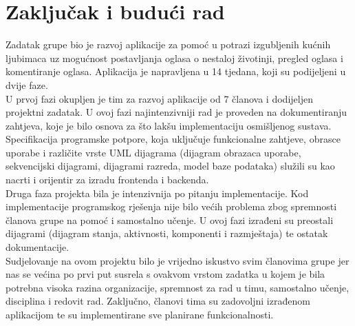 \chapter{Zaključak i budući rad}
		
		
		
		
		Zadatak grupe bio je razvoj aplikacije za pomoć u potrazi izgubljenih kućnih ljubimaca uz mogućnost postavljanja oglasa o nestaloj životinji, pregled oglasa i komentiranje oglasa. Aplikacija je napravljena  u 14 tjedana, koji su podijeljeni u dvije faze.\\
		\indent U prvoj fazi okupljen je tim za razvoj aplikacije od 7 članova i dodijeljen projektni zadatak. U ovoj fazi najintenzivniji rad je proveden na dokumentiranju zahtjeva, koje je bilo osnova za što lakšu implementaciju osmišljenog sustava. Specifikacija programske potpore, koja uključuje funkcionalne zahtjeve, obrasce uporabe i različite vrste UML dijagrama (dijagram obrazaca uporabe, sekvencijski dijagrami, dijagrami razreda, model baze podataka) služili su kao nacrti i orijentir za izradu frontenda i backenda.\\
		\indent Druga faza projekta bila je intenzivnija po pitanju implementacije. Kod implementacije programskog rješenja nije bilo većih problema zbog spremnosti članova grupe na pomoć i samostalno učenje. U ovoj fazi izrađeni su preostali dijagrami (dijagram stanja, aktivnosti, komponenti i razmještaja) te ostatak dokumentacije.\\
		\indent Sudjelovanje na ovom projektu bilo je vrijedno iskustvo svim članovima grupe jer nas se većina po prvi put susrela s ovakvom vrstom zadatka u kojem je bila potrebna visoka razina organizacije, spremnost za rad u timu, samostalno učenje, disciplina i redovit rad. Zaključno, članovi tima su zadovoljni izrađenom aplikacijom te su implementirane sve planirane funkcionalnosti.
		
		
		\eject 